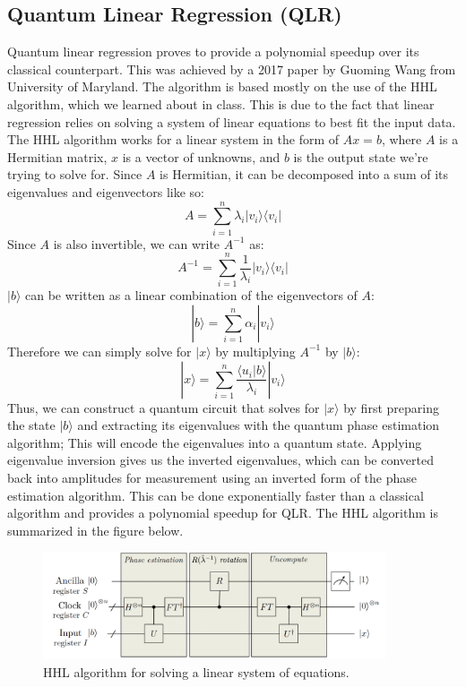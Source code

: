 \documentclass[12pt]{article}
\begin{document}
\subsection*{Quantum Linear Regression (QLR)}
Quantum linear regression proves to provide a polynomial speedup over its classical counterpart. This was achieved by a 2017 paper by Guoming Wang from University of Maryland. \cite{Wang_2017} The algorithm is based mostly on the use of the HHL algorithm, which we learned about in class. This is due to the fact that linear regression relies on solving a system of linear equations to best fit the input data. \\
The HHL algorithm works for a linear system in the form of $Ax = b$, where $A$ is a Hermitian matrix, $x$ is a vector of unknowns, and $b$ is the output state we're trying to solve for. Since $A$ is Hermitian, it can be decomposed into a sum of its eigenvalues and eigenvectors like so:
\begin{equation}
    A = \sum_{i=1}^n \lambda_i |v_i\rangle \langle v_i|
\end{equation} 
Since $A$ is also invertible, we can write $A^{-1}$ as:
\begin{equation}
    A^{-1} = \sum_{i=1}^n \frac{1}{\lambda_i} |v_i\rangle \langle v_i|
\end{equation}
$|b\rangle$ can be written as a linear combination of the eigenvectors of $A$:
\begin{equation}
    |b\rangle = \sum_{i=1}^n \alpha_i |v_i\rangle
\end{equation}
Therefore we can simply solve for $|x\rangle$ by multiplying $A^{-1}$ by $|b\rangle$:
\begin{equation}
    |x\rangle = \sum_{i=1}^n \frac{\langle u_i | b \rangle }{\lambda_i} |v_i\rangle
\end{equation}
Thus, we can construct a quantum circuit that solves for $|x\rangle$ by first preparing the state $|b\rangle$ and extracting its eigenvalues with the quantum phase estimation algorithm; This will encode the eigenvalues into a quantum state. Applying eigenvalue inversion gives us the inverted eigenvalues, which can be converted back into amplitudes for measurement using an inverted form of the phase estimation algorithm. This can be done exponentially faster than a classical algorithm and provides a polynomial speedup for QLR.\cite{palsberg_2022}\cite{Wang_2017} The HHL algorithm is summarized in the figure below.
\begin{figure}[h]
\centering
\includegraphics[width=0.9\textwidth]{HHL_Algo.png}
\caption{HHL algorithm for solving a linear system of equations. \cite{palsberg_2022}}
\end{figure}
\end{document}
